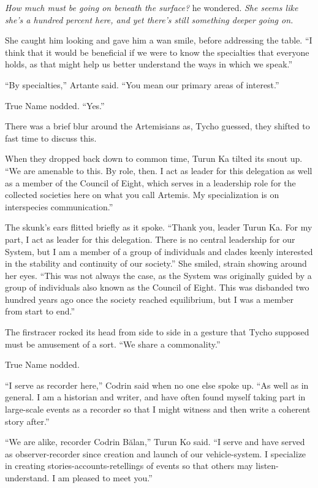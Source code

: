 \emph{How much must be going on beneath the surface?} he wondered. \emph{She seems like she's a hundred percent here, and yet there's still something deeper going on.}

She caught him looking and gave him a wan smile, before addressing the table. ``I think that it would be beneficial if we were to know the specialties that everyone holds, as that might help us better understand the ways in which we speak.''

``By specialties,'' Artante said. ``You mean our primary areas of interest.''

True Name nodded. ``Yes.''

There was a brief blur around the Artemisians as, Tycho guessed, they shifted to fast time to discuss this.

When they dropped back down to common time, Turun Ka tilted its snout up. ``We are amenable to this. By role, then. I act as leader for this delegation as well as a member of the Council of Eight, which serves in a leadership role for the collected societies here on what you call Artemis. My specialization is on interspecies communication.''

The skunk's ears flitted briefly as it spoke. ``Thank you, leader Turun Ka. For my part, I act as leader for this delegation. There is no central leadership for our System, but I am a member of a group of individuals and clades keenly interested in the stability and continuity of our society.'' She smiled, strain showing around her eyes. ``This was not always the case, as the System was originally guided by a group of individuals also known as the Council of Eight. This was disbanded two hundred years ago once the society reached equilibrium, but I was a member from start to end.''

The firstracer rocked its head from side to side in a gesture that Tycho supposed must be amusement of a sort. ``We share a commonality.''

True Name nodded.

``I serve as recorder here,'' Codrin said when no one else spoke up. ``As well as in general. I am a historian and writer, and have often found myself taking part in large-scale events as a recorder so that I might witness and then write a coherent story after.''

``We are alike, recorder Codrin Bălan,'' Turun Ko said. ``I serve and have served as observer-recorder since creation and launch of our vehicle-system. I specialize in creating stories-accounts-retellings of events so that others may listen-understand. I am pleased to meet you.''

